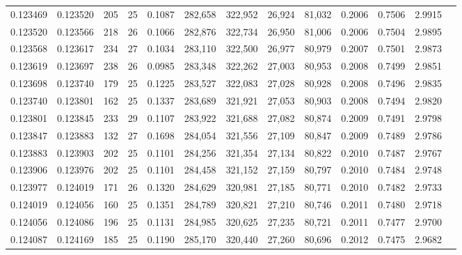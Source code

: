 \begin{tabular}{rrrrrrrrrrrrr}
0.123469 & 0.123520 & 205 &  25 &                                     0.1087 & 282,658 & 322,952 &  26,924 &  81,032 & 0.2006 & 0.7506 & 2.9915 \\
0.123520 & 0.123566 & 218 &  26 &                                     0.1066 & 282,876 & 322,734 &  26,950 &  81,006 & 0.2006 & 0.7504 & 2.9895 \\
0.123568 & 0.123617 & 234 &  27 &                                     0.1034 & 283,110 & 322,500 &  26,977 &  80,979 & 0.2007 & 0.7501 & 2.9873 \\
0.123619 & 0.123697 & 238 &  26 &                                     0.0985 & 283,348 & 322,262 &  27,003 &  80,953 & 0.2008 & 0.7499 & 2.9851 \\
0.123698 & 0.123740 & 179 &  25 &                                     0.1225 & 283,527 & 322,083 &  27,028 &  80,928 & 0.2008 & 0.7496 & 2.9835 \\
0.123740 & 0.123801 & 162 &  25 &                                     0.1337 & 283,689 & 321,921 &  27,053 &  80,903 & 0.2008 & 0.7494 & 2.9820 \\
0.123801 & 0.123845 & 233 &  29 &                                     0.1107 & 283,922 & 321,688 &  27,082 &  80,874 & 0.2009 & 0.7491 & 2.9798 \\
0.123847 & 0.123883 & 132 &  27 &                                     0.1698 & 284,054 & 321,556 &  27,109 &  80,847 & 0.2009 & 0.7489 & 2.9786 \\
0.123883 & 0.123903 & 202 &  25 &                                     0.1101 & 284,256 & 321,354 &  27,134 &  80,822 & 0.2010 & 0.7487 & 2.9767 \\
0.123906 & 0.123976 & 202 &  25 &                                     0.1101 & 284,458 & 321,152 &  27,159 &  80,797 & 0.2010 & 0.7484 & 2.9748 \\
0.123977 & 0.124019 & 171 &  26 &                                     0.1320 & 284,629 & 320,981 &  27,185 &  80,771 & 0.2010 & 0.7482 & 2.9733 \\
0.124019 & 0.124056 & 160 &  25 &                                     0.1351 & 284,789 & 320,821 &  27,210 &  80,746 & 0.2011 & 0.7480 & 2.9718 \\
0.124056 & 0.124086 & 196 &  25 &                                     0.1131 & 284,985 & 320,625 &  27,235 &  80,721 & 0.2011 & 0.7477 & 2.9700 \\
0.124087 & 0.124169 & 185 &  25 &                                     0.1190 & 285,170 & 320,440 &  27,260 &  80,696 & 0.2012 & 0.7475 & 2.9682 \\

\end{tabular}
